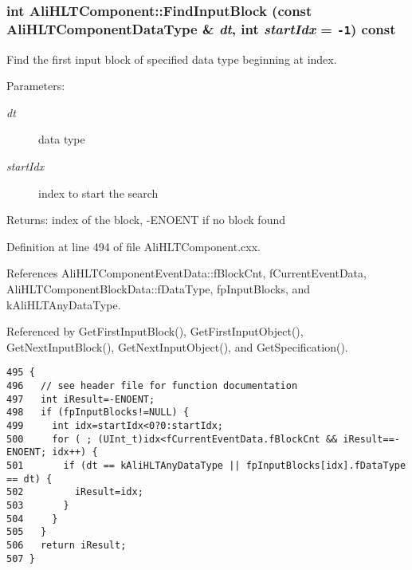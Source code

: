\subsubsection{\setlength{\rightskip}{0pt plus 5cm}int Ali\-HLTComponent::Find\-Input\-Block (const {\bf Ali\-HLTComponent\-Data\-Type} \& {\em dt}, int {\em start\-Idx} = {\tt -1}) const\hspace{0.3cm}{\tt  [private]}}\label{classAliHLTComponent_d1}


Find the first input block of specified data type beginning at index. \begin{Desc}
\item[Parameters:]
\begin{description}
\item[{\em dt}]data type \item[{\em start\-Idx}]index to start the search \end{description}
\end{Desc}
\begin{Desc}
\item[Returns:]index of the block, -ENOENT if no block found \end{Desc}


Definition at line 494 of file Ali\-HLTComponent.cxx.

References Ali\-HLTComponent\-Event\-Data::f\-Block\-Cnt, f\-Current\-Event\-Data, Ali\-HLTComponent\-Block\-Data::f\-Data\-Type, fp\-Input\-Blocks, and k\-Ali\-HLTAny\-Data\-Type.

Referenced by Get\-First\-Input\-Block(), Get\-First\-Input\-Object(), Get\-Next\-Input\-Block(), Get\-Next\-Input\-Object(), and Get\-Specification().

\footnotesize\begin{verbatim}495 {
496   // see header file for function documentation
497   int iResult=-ENOENT;
498   if (fpInputBlocks!=NULL) {
499     int idx=startIdx<0?0:startIdx;
500     for ( ; (UInt_t)idx<fCurrentEventData.fBlockCnt && iResult==-ENOENT; idx++) {
501       if (dt == kAliHLTAnyDataType || fpInputBlocks[idx].fDataType == dt) {
502         iResult=idx;
503       }
504     }
505   }
506   return iResult;
507 }
\end{verbatim}\normalsize 


